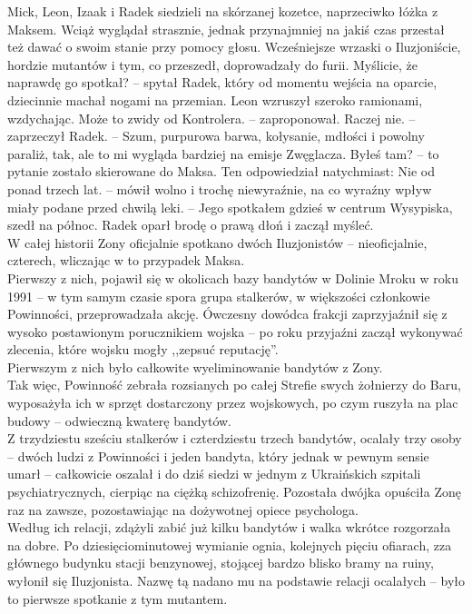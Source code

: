 \documentclass[../MAIN.tex]{subfiles}
\begin{document}
\qd
Mick, Leon, Izaak i Radek siedzieli na skórzanej kozetce, naprzeciwko łóżka z Maksem. Wciąż wyglądał strasznie, jednak przynajmniej na jakiś czas przestał też dawać o swoim stanie przy pomocy głosu. Wcześniejsze wrzaski o Iluzjoniście, hordzie mutantów i tym, co przeszedł, doprowadzały do furii.
\sx Myślicie, że naprawdę go spotkał? -- spytał Radek, który od momentu wejścia na oparcie, dziecinnie machał nogami na przemian.
\qd
Leon wzruszył szeroko ramionami, wzdychając.
\sx Może to zwidy od Kontrolera. -- zaproponował.
\xx Raczej nie. -- zaprzeczył Radek. -- Szum, purpurowa barwa, kołysanie, mdłości i powolny paraliż, tak, ale to mi wygląda bardziej na emisje Zwęglacza. Byłeś tam? -- to pytanie zostało skierowane do Maksa.
\qd
Ten odpowiedział natychmiast:
\sx Nie od ponad trzech lat. -- mówił wolno i trochę niewyraźnie, na co wyraźny wpływ miały podane przed chwilą leki. -- Jego spotkałem gdzieś w centrum Wysypiska, szedł na północ.
\qd
Radek oparł brodę o prawą dłoń i zaczął myśleć.\\
W całej historii Zony oficjalnie spotkano dwóch Iluzjonistów -- nieoficjalnie, czterech, wliczając w to przypadek Maksa.\\
Pierwszy z nich, pojawił się w okolicach bazy bandytów w Dolinie Mroku w roku 1991 -- w tym samym czasie spora grupa stalkerów, w większości członkowie Powinności, przeprowadzała akcję. Ówczesny dowódca frakcji zaprzyjaźnił się z wysoko postawionym porucznikiem wojska -- po roku przyjaźni zaczął wykonywać zlecenia, które wojsku mogły ,,zepsuć reputację''.\\
Pierwszym z nich było całkowite wyeliminowanie bandytów z Zony.\\
Tak więc, Powinność zebrała rozsianych po całej Strefie swych żołnierzy do Baru, wyposażyła ich w sprzęt dostarczony przez wojskowych, po czym ruszyła na plac budowy -- odwieczną kwaterę bandytów.\\
Z trzydziestu sześciu stalkerów i czterdziestu trzech bandytów, ocalały trzy osoby -- dwóch ludzi z Powinności i jeden bandyta, który jednak w pewnym sensie umarł -- całkowicie oszalał i do dziś siedzi w jednym z Ukraińskich szpitali psychiatrycznych, cierpiąc na ciężką schizofrenię. Pozostała dwójka opuściła Zonę raz na zawsze, pozostawiając na dożywotnej opiece psychologa.\\
Według ich relacji, zdążyli zabić już kilku bandytów i walka wkrótce rozgorzała na dobre. Po dziesięciominutowej wymianie ognia, kolejnych pięciu ofiarach, zza głównego budynku stacji benzynowej, stojącej bardzo blisko bramy na ruiny, wyłonił się Iluzjonista. Nazwę tą nadano mu na podstawie relacji ocalałych -- było to pierwsze spotkanie z tym mutantem.\\
\end{document}
